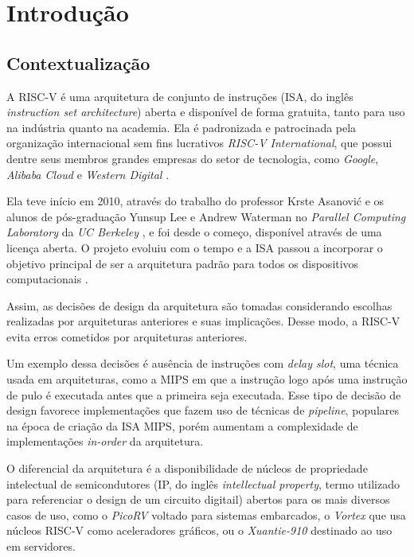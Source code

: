 
\chapter{Introdução}
\label{cap:introducao}

\section{Contextualização}
\label{sec:ic}

A RISC-V é uma arquitetura de conjunto de instruções (ISA, do inglês 
\emph{instruction set architecture}) aberta e disponível de forma gratuita, 
tanto para uso na indústria quanto na academia. 
Ela é padronizada e patrocinada pela organização 
internacional sem fins lucrativos \emph{RISC-V International},
que possui dentre seus membros grandes 
empresas do setor de tecnologia, como \emph{Google}, \emph{Alibaba Cloud} e 
\emph{Western Digital} \citep{MEM}.

Ela teve início em 2010, através do trabalho do professor Krste Asanović e os 
alunos de pós-graduação Yunsup Lee e Andrew Waterman no \emph{Parallel Computing
Laboratory} da \emph{UC Berkeley} \citep{RVH}, e foi desde o começo, disponível 
através de uma licença aberta. O projeto evoluiu com o tempo e a ISA passou 
a incorporar o objetivo principal de ser a arquitetura padrão para todos os dispositivos 
computacionais \citep{Asanović:EECS-2014-146}.

Assim, as decisões de design da arquitetura são tomadas considerando escolhas 
realizadas por arquiteturas anteriores e suas implicações. Desse modo, a RISC-V
evita erros cometidos por arquiteturas anteriores.

Um exemplo dessa decisões é 
ausência de instruções com \emph{delay slot}, uma técnica usada 
em arquiteturas, como a MIPS \citep{DSTL} em que a instrução logo após uma instrução
de pulo é executada antes que a primeira seja executada. Esse tipo de decisão de design
favorece implementações que fazem uso de técnicas de \emph{pipeline},
populares na época de criação da ISA MIPS, porém aumentam a complexidade de implementações \emph{in-order} 
da arquitetura.

O diferencial da arquitetura é a disponibilidade de núcleos de propriedade intelectual
de semicondutores (IP, do inglês \emph{intellectual property}, termo utilizado para referenciar o design de um circuito digitail) 
abertos para os mais 
diversos casos de uso, como o \emph{PicoRV} \citep{PICO} voltado para sistemas embarcados, 
o \emph{Vortex} \citep{elsabbagh2020vortex} que usa núcleos RISC-V como aceleradores 
gráficos, ou o \emph{Xuantie-910} \citep{9138983} destinado ao uso em servidores.

